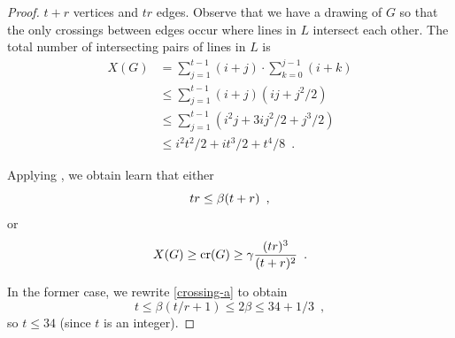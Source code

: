 \documentclass{patmorin}
\DeclareMathOperator{\cn}{cr}
\begin{document}
\begin{proof}
 $t+r$ vertices
and $tr$ edges.  Observe that we have a drawing of $G$ so that the only
crossings between edges occur where lines in $L$ intersect each other.
The total number of intersecting pairs of lines in $L$ is
\[
  \begin{aligned}
    X(G) 
      & = \sum_{j=1}^{t-1}(i+j)\cdot\sum_{k=0}^{j-1}(i+k) \\
      & \le \sum_{j=1}^{t-1}(i+j)(ij + j^2/2) \\
      & \le \sum_{j=1}^{t-1}(i^2j+3ij^2/2 + j^3/2) \\
      & \le i^2t^2/2 + it^3/2 + t^4/8 \enspace .
  \end{aligned}
\]

Applying , we obtain learn that either
\begin{equation}
   tr \le \beta (t+r) \enspace , \eqlabel{crossing-a}
\end{equation}
or
\begin{equation}
   X(G) \ge \cn(G) \ge \gamma \frac{(tr)^3}{(t+r)^2} \eqlabel{crossing-b} \enspace .
\end{equation}

In the former case, we rewrite \eqref{crossing-a} to obtain
\[
   t \le \beta(t/r + 1) \le 2\beta \le 34 + 1/3 \enspace ,
\]
so $t\le 34$ (since $t$ is an integer).


\end{proof}
\end{document}
